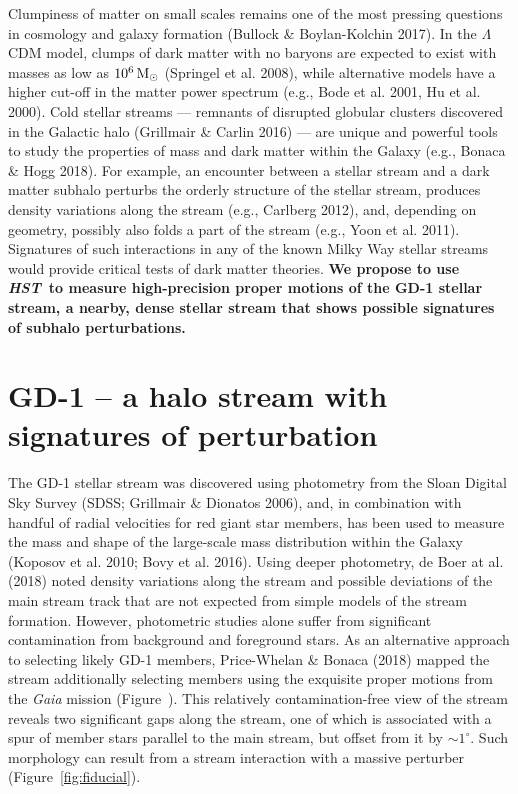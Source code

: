 \documentclass[12pt]{article}
\newcommand{\hst}{\textsl{HST}}
\begin{document}
%
%
\justification          %

Clumpiness of matter on small scales remains one of the most pressing questions in cosmology and galaxy formation (Bullock \& Boylan-Kolchin 2017).
In the $\Lambda$CDM model, clumps of dark matter with no baryons are expected to exist with masses as low as $10^{6}\rm\,M_\odot$ (Springel et al. 2008), while alternative models have a higher cut-off in the matter power spectrum (e.g., Bode et al. 2001, Hu et al. 2000).
Cold stellar streams --- remnants of disrupted globular clusters discovered in the Galactic halo (Grillmair \& Carlin 2016) --- are unique and powerful tools to study the properties of mass and dark matter within the Galaxy (e.g., Bonaca \& Hogg 2018).
For example, an encounter between a stellar stream and a dark matter subhalo perturbs the orderly structure of the stellar stream, produces density variations along the stream (e.g., Carlberg 2012), and, depending on geometry, possibly also folds a part of the stream (e.g., Yoon et al. 2011).
Signatures of such interactions in any of the known Milky Way stellar streams would provide critical tests of dark matter theories.
{\bf We propose to use \hst\ to measure high-precision proper motions of the GD-1 stellar stream, a nearby, dense stellar stream that shows possible signatures of subhalo perturbations.}

\section*{GD-1 -- a halo stream with signatures of perturbation}
The GD-1 stellar stream was discovered using photometry from the Sloan Digital Sky Survey (SDSS; Grillmair \& Dionatos 2006),
and, in combination with handful of radial velocities for red giant star members, has been used to measure the mass and shape of the large-scale mass distribution within the Galaxy (Koposov et al. 2010; Bovy et al. 2016).
Using deeper photometry, de Boer at al. (2018) noted density variations along the stream and possible deviations of the main stream track that are not expected from simple models of the stream formation.
However, photometric studies alone suffer from significant contamination from background and foreground stars.
As an alternative approach to selecting likely GD-1 members, Price-Whelan \& Bonaca (2018) mapped the stream additionally selecting members using the exquisite proper motions from the \textit{Gaia} mission (Figure~).
This relatively contamination-free view of the stream reveals two significant gaps along the stream, one of which is associated with a spur of member stars parallel to the main stream, but offset from it by $\sim1^\circ$.
Such morphology can result from a stream interaction with a massive perturber (Figure~\ref{fig:fiducial}).
\end{document}
